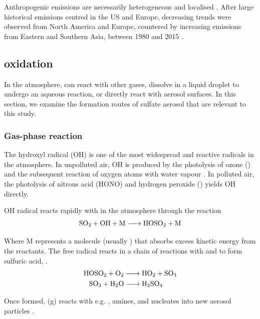 Anthropogenic  emissions are necessarily heterogeneous and localised \citep{manktelowRegionalGlobalTrends2007}. After large historical emissions centred in the US and Europe, decreasing trends were observed from North America and Europe, countered by increasing emissions from Eastern and Southern Asia, between 1980 and 2015 \citep{szopaShortlivedClimateForcers2021, aasGlobalRegionalTrends2019}. 




\subsection{ oxidation}
\label{ch1:so2-oxidation}

In the atmosphere,  can react with other gases, dissolve in a liquid droplet to undergo an aqueous reaction, or directly react with aerosol surfaces. In this section, we examine the formation routes of sulfate aerosol that are relevant to this study. 

\subsubsection{Gas-phase reaction}

The hydroxyl radical (OH) is one of the most widespread and reactive radicals in the atmosphere. In unpolluted air, OH is produced by the photolysis of ozone () and the subsequent reaction of oxygen atoms with water vapour \citep{wayneChemistryAtmospheresIntroduction2006}. In polluted air, the photolysis of nitrous acid (HONO) and hydrogen peroxide () yields OH directly. 

OH radical reacts rapidly with  in the atmosphere through the reaction
\begin{align}
\ce{SO2 + OH + M -> HOSO2 + M}    
\label{ch1:eq:so2-oh}
\end{align}

Where M represents a molecule (usually ) that absorbs excess kinetic energy from the reactants. The free radical  reacts in a chain of reactions with  and  to form sulfuric acid, .
\begin{align}
\ce{HOSO2 + O2 &-> HO2 + SO3}\\
\ce{SO3 + H2O &-> H2SO4}
\end{align}

Once formed,  (g) reacts with e.g. , amines,  and nucleates into new aerosol particles \citep{seinfeldAtmosphericChemistryPhysics2016}.

